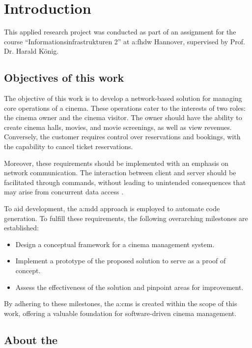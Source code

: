 \chapter{Introduction}
\label{ch:intro}

This applied research project was conducted as part of an assignment for the course \enquote{Informationsinfrastrukturen 2} at \gls{a:fhdw} Hannover, supervised by Prof. Dr. Harald König.

\section{Objectives of this work}

The objective of this work is to develop a network-based solution for managing core operations of a cinema. These operations cater to the interests of two roles: the cinema owner and the cinema visitor. The owner should have the ability to create cinema halls, movies, and movie screenings, as well as view revenues. Conversely, the customer requires control over reservations and bookings, with the capability to cancel ticket reservations.

Moreover, these requirements should be implemented with an emphasis on network communication. The interaction between client and server should be facilitated through commands, without leading to unintended consequences that may arise from concurrent data access \cite[2]{IIS2-ass}.

To aid development, the \gls{a:mdd} approach is employed to automate code generation. To fulfill these requirements, the following overarching milestones are established:

\begin{itemize}
\item Design a conceptual framework for a cinema management system.
\item Implement a prototype of the proposed solution to serve as a proof of concept.
\item Assess the effectiveness of the solution and pinpoint areas for improvement.
\end{itemize}

By adhering to these milestones, the \gls{a:cms} is created within the scope of this work, offering a valuable foundation for software-driven cinema management.

\section{About the }


